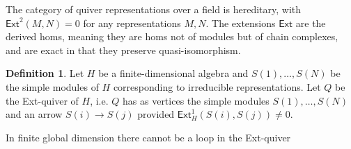 \documentclass{article}
\theoremstyle{definition}
\newtheorem{definition}{Definition}[section]
\begin{document}
The category of quiver representations over a field is hereditary, with $\mathsf{Ext}^2(M, N)=0$ for any representations $M, N$. The extensions $\mathsf{Ext}$ are the derived homs, meaning they are homs not of modules but of chain complexes, and are exact in that they preserve quasi-isomorphism. 

\begin{definition}
    Let $H$ be a finite-dimensional algebra and $S(1),\dots,S(N)$ be the simple modules of $H$ corresponding to irreducible representations. Let $Q$ be the Ext-quiver of $H$, i.e. $Q$ has as vertices the simple modules $S(1),\dots, S(N)$ and an arrow $S(i) \to S(j)$ provided $\mathsf{Ext}^1_H(S(i),S(j)) \neq 0$.
\end{definition} 

In finite global dimension there cannot be a loop in the Ext-quiver




\newpage
\printbibliography


\end{document}
